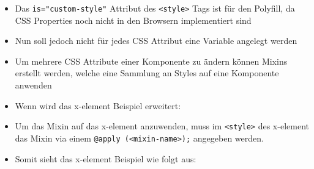 \begin{itemize}
\tightlist
\item
  Das \texttt{is="custom-style"} Attribut des
  \texttt{\textless{}style\textgreater{}} Tags ist für den Polyfill, da
  CSS Properties noch nicht in den Browsern implementiert sind
\item
  Nun soll jedoch nicht für jedes CSS Attribut eine Variable angelegt
  werden
\item
  Um mehrere CSS Attribute einer Komponente zu ändern können Mixins
  erstellt werden, welche eine Sammlung an Styles auf eine Komponente
  anwenden
\item
  Wenn wird das x-element Beispiel erweitert:
\end{itemize}

\begin{Shaded}
\begin{Highlighting}[]
\KeywordTok{>}
  \KeywordTok{\{}
     \KeywordTok{;}
     \NormalTok{\{}
        \DataTypeTok{10px}\KeywordTok{;}
         \DataTypeTok{10px}\KeywordTok{;}
    \KeywordTok{\}}\NormalTok{;}
  \NormalTok{\}}
\end{Highlighting}
\end{Shaded}

\begin{itemize}
\tightlist
\item
  Um das Mixin auf das x-element anzuwenden, muss im
  \texttt{\textless{}style\textgreater{}} des x-element das Mixin via
  einem \texttt{@apply\ (\textless{}mixin-name\textgreater{});}
  angegeben werden.
\item
  Somit sieht das x-element Beispiel wie folgt aus:
\end{itemize}

\begin{Shaded}
\begin{Highlighting}[]
\KeywordTok{>}
       \KeywordTok{\{}
         \NormalTok{)}\KeywordTok{;}

      \KeywordTok{\}}
\end{Highlighting}
\end{Shaded}

